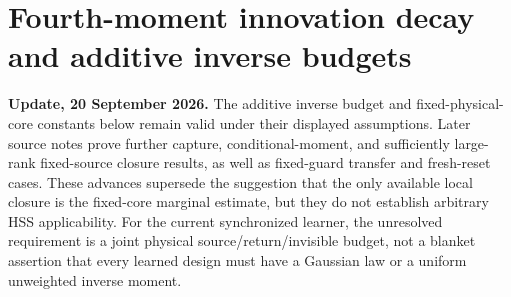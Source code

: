 \documentclass[11pt,oneside,openany,a4paper]{book}
\numberwithin{equation}{chapter}
\theoremstyle{definition}
\theoremstyle{remark}
\newcommand{\R}{\mathbb R}\newcommand{\E}{\mathbb E}\newcommand{\Prb}{\mathbb P}\newcommand{\PP}{\mathbb P}
\newcommand{\F}[1]{\left\lVert#1\right\rVert_F}
\newcommand{\op}[1]{\left\lVert#1\right\rVert_{\rm op}}
\DeclareMathOperator{\tr}{tr}\DeclareMathOperator{\rank}{rank}
\DeclareMathOperator{\diag}{blockdiag}\DeclareMathOperator{\range}{range}
\DeclareMathOperator{\ran}{range}\DeclareMathOperator{\OPT}{OPT}
\begin{document}
\endgroup

\begingroup
\let\E\relax
\newcommand{\E}{\mathbb E}
\let\R\relax
\newcommand{\R}{\mathbb R}
\let\Id\relax
\newcommand{\Id}{\mathrm I}
\let\F\relax
\newcommand{\F}[1]{\lVert #1\rVert_F}
\let\op\relax
\newcommand{\op}[1]{\lVert #1\rVert_{\rm op}}
\let\tr\relax
\newcommand{\tr}{\operatorname{tr}}
\let\ran\relax
\newcommand{\ran}{\operatorname{range}}
\let\rank\relax
\newcommand{\rank}{\operatorname{rank}}
\let\diag\relax
\newcommand{\diag}{\operatorname{blockdiag}}
\let\dist\relax
\newcommand{\dist}{\operatorname{dist}}
\let\OPT\relax
\newcommand{\OPT}{\operatorname{OPT}}
\chapter{Fourth-moment innovation decay and additive inverse budgets}\label{ch:core}
\begin{scopebox}
\textbf{Update, 20 September 2026.} The additive inverse budget and fixed-physical-core constants below remain valid under their displayed assumptions. Later source notes prove further capture, conditional-moment, and sufficiently large-rank fixed-source closure results, as well as fixed-guard transfer and fresh-reset cases. These advances supersede the suggestion that the only available local closure is the fixed-core marginal estimate, but they do not establish arbitrary HSS applicability. For the current synchronized learner, the unresolved requirement is a joint physical source/return/invisible budget, not a blanket assertion that every learned design must have a Gaussian law or a uniform unweighted inverse moment.
\end{scopebox}
\end{document}
